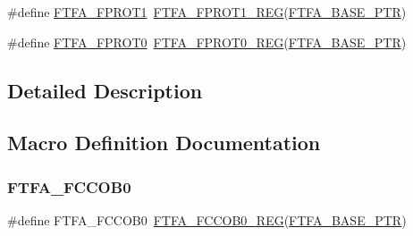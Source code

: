 \begin{DoxyCompactItemize}
\item 
\#define \hyperlink{group___f_t_f_a___register___accessor___macros_ga6fa22ad27ded5b2e13a5b6dd22d6641d}{F\+T\+F\+A\+\_\+\+F\+P\+R\+O\+T1}~\hyperlink{group___f_t_f_a___register___accessor___macros_ga80a3353ab5eabe7bde5fee5328bdc908}{F\+T\+F\+A\+\_\+\+F\+P\+R\+O\+T1\+\_\+\+R\+EG}(\hyperlink{group___f_t_f_a___peripheral_ga13ad52f12d5b04e5e01f69ab18ed9216}{F\+T\+F\+A\+\_\+\+B\+A\+S\+E\+\_\+\+P\+TR})
\item 
\#define \hyperlink{group___f_t_f_a___register___accessor___macros_gad1a0d6a372aec4a0f1b41e9f8d45f59b}{F\+T\+F\+A\+\_\+\+F\+P\+R\+O\+T0}~\hyperlink{group___f_t_f_a___register___accessor___macros_gae6f345fa6f7defc0912a0dcc9f217dbf}{F\+T\+F\+A\+\_\+\+F\+P\+R\+O\+T0\+\_\+\+R\+EG}(\hyperlink{group___f_t_f_a___peripheral_ga13ad52f12d5b04e5e01f69ab18ed9216}{F\+T\+F\+A\+\_\+\+B\+A\+S\+E\+\_\+\+P\+TR})
\end{DoxyCompactItemize}


\subsection{Detailed Description}


\subsection{Macro Definition Documentation}
\mbox{\label{group___f_t_f_a___register___accessor___macros_gabf351100528fd5d4a09bf57c2b9acc40}} 
\subsubsection{\texorpdfstring{F\+T\+F\+A\+\_\+\+F\+C\+C\+O\+B0}{FTFA\_FCCOB0}}
{\footnotesize\ttfamily \#define F\+T\+F\+A\+\_\+\+F\+C\+C\+O\+B0~\hyperlink{group___f_t_f_a___register___accessor___macros_gae65af2867fb5ebe9330a3af6a7ecef75}{F\+T\+F\+A\+\_\+\+F\+C\+C\+O\+B0\+\_\+\+R\+EG}(\hyperlink{group___f_t_f_a___peripheral_ga13ad52f12d5b04e5e01f69ab18ed9216}{F\+T\+F\+A\+\_\+\+B\+A\+S\+E\+\_\+\+P\+TR})}

\mbox{\label{group___f_t_f_a___register___accessor___macros_gae65af2867fb5ebe9330a3af6a7ecef75}} 
